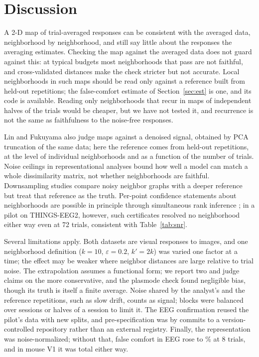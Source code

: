\documentclass[11pt]{article}
\begin{document}
\section{Discussion}\label{sec:disc}

A 2-D map of trial-averaged responses can be consistent with the averaged data, neighborhood by
neighborhood, and still say little about the responses the averaging estimates. Checking the map
against the averaged data does not guard against this: at typical budgets most neighborhoods that
pass are not faithful, and cross-validated distances make the check stricter but not accurate.
Local neighborhoods in such maps should be read only against a reference built from held-out
repetitions; the false-comfort estimate of Section~\ref{sec:est} is one, and its code is
available. Reading only neighborhoods that recur in maps of independent halves of the trials
would be cheaper, but we have not tested it, and recurrence is not the same as faithfulness to
the noise-free responses.

Lin and Fukuyama \citep{lin2024} also judge maps against a denoised signal, obtained by PCA
truncation of the same data; here the reference comes from held-out repetitions, at the level
of individual neighborhoods and as a function of the number of trials. Noise ceilings in
representational analyses \citep{nili2014,schutt2023} bound how well a model can match a whole
dissimilarity matrix, not whether neighborhoods are faithful. Downsampling studies compare
noisy neighbor graphs with a deeper reference \citep{ahlmann2023} but treat that reference as
the truth. Per-point confidence statements about neighborhoods are possible in principle through
simultaneous rank inference \citep{mogstad2024}; in a pilot on THINGS-EEG2, however, such
certificates resolved no neighborhood either way even at 72 trials, consistent with
Table~\ref{tab:snr}.

Several limitations apply. Both datasets are visual responses to images, and one neighborhood
definition ($k=10$, $\varepsilon=0.2$, $k'=2k$) was varied one factor at a time; the effect may
be weaker where neighbor distances are large relative to trial noise. The extrapolation assumes
a functional form; we report two and judge claims on the more conservative, and the plasmode
check found negligible bias, though its truth is itself a finite average. Noise shared by the
analyst's and the reference repetitions, such as slow drift, counts as signal; blocks were
balanced over sessions or halves of a session to limit it. The EEG confirmation reused the
pilot's data with new splits, and pre-specification was by commits to a version-controlled
repository rather than an external registry. Finally, the representation was noise-normalized;
without that, false comfort in EEG rose to \EegUnwhitenedFC\% at 8 trials, and in mouse V1 it
was total either way.
\end{document}
